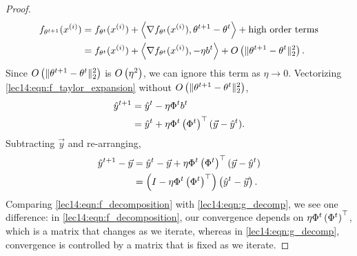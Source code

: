 \begin{proof}
\begin{align}
   f_{\theta^{t+1}}(x^{(i)}) &= f_{\theta^{t}}(x^{(i)}) + \left<\nabla f_{\theta^t}(x^{(i)}), \theta^{t+1} - \theta^t \right> + \text{high order terms} \\
   &= f_{\theta^{t }}(x^{(i)}) + \left<\nabla f_{\theta^t}(x^{(i)}), -\eta b^t \right> + O\left(\|\theta^{t+1} - \theta^t\|_2^2\right). \label{lec14:eqn:f_taylor_expansion}
 \end{align}
Since $O\left(\|\theta^{t+1} - \theta^t\|_2^2\right)$ is $O\left(\eta^2\right)$, we can ignore this term as $\eta \rightarrow 0$. Vectorizing \eqref{lec14:eqn:f_taylor_expansion} without $O\left(\|\theta^{t+1} - \theta^t\|_2^2\right)$,
\begin{align}
    \hat{y}^{t+1} &= \hat{y}^t - \eta \Phi^t b^t \\
    &= \hat{y}^t + \eta \Phi^t\left(\Phi^t\right)^\top(\vec{y} - \hat{y}^t).
\end{align}
Subtracting $\vec{y}$ and re-arranging,
\begin{align}
    \hat{y}^{t+1} - \vec{y} &= \hat{y}^t - \vec{y} + \eta \Phi^t\left(\Phi^t\right)^\top(\vec{y} - \hat{y}^t) \\ 
    &= \left(I - \eta \Phi^t\left(\Phi^t\right)^\top\right)\left(\hat{y}^t - \vec{y}\right). \label{lec14:eqn:f_decomposition}
\end{align}
Comparing \eqref{lec14:eqn:f_decomposition} with \eqref{lec14:eqn:g_decomp}, we see one difference: in \eqref{lec14:eqn:f_decomposition}, our convergence depends on $\eta \Phi^t\left(\Phi^t\right)^\top$, which is a matrix that changes as we iterate, whereas in \eqref{lec14:eqn:g_decomp}, convergence is controlled by a matrix that is fixed as we iterate. 


\end{proof}
